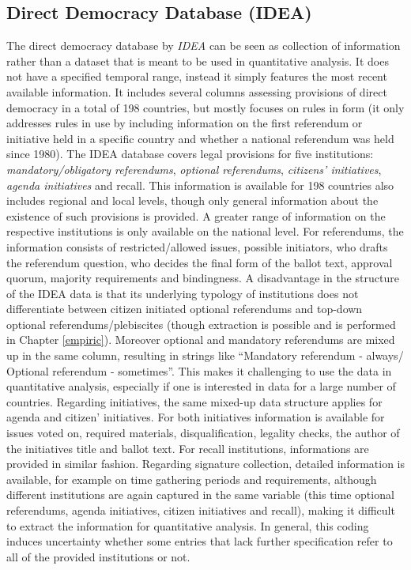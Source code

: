 \documentclass[]{article}
\begin{document}
\subsection{Direct Democracy Database
(IDEA)}\label{direct-democracy-database-idea}

The direct democracy database by \emph{IDEA} can be seen as collection
of information rather than a dataset that is meant to be used in
quantitative analysis. It does not have a specified temporal range,
instead it simply features the most recent available information. It
includes several columns assessing provisions of direct democracy in a
total of 198 countries, but mostly focuses on rules in form (it only
addresses rules in use by including information on the first referendum
or initiative held in a specific country and whether a national
referendum was held since 1980). The IDEA database covers legal
provisions for five institutions: \emph{mandatory/obligatory
referendums}, \emph{optional referendums}, \emph{citizens' initiatives},
\emph{agenda initiatives} and recall. This information is available for
198 countries also includes regional and local levels, though only
general information about the existence of such provisions is provided.
A greater range of information on the respective institutions is only
available on the national level. For referendums, the information
consists of restricted/allowed issues, possible initiators, who drafts
the referendum question, who decides the final form of the ballot text,
approval quorum, majority requirements and bindingness. A disadvantage
in the structure of the IDEA data is that its underlying typology of
institutions does not differentiate between citizen initiated optional
referendums and top-down optional referendums/plebiscites (though
extraction is possible and is performed in Chapter \ref{empiric}).
Moreover optional and mandatory referendums are mixed up in the same
column, resulting in strings like ``Mandatory referendum - always/
Optional referendum - sometimes''. This makes it challenging to use the
data in quantitative analysis, especially if one is interested in data
for a large number of countries. Regarding initiatives, the same
mixed-up data structure applies for agenda and citizen' initiatives. For
both initiatives information is available for issues voted on, required
materials, disqualification, legality checks, the author of the
initiatives title and ballot text. For recall institutions, informations
are provided in similar fashion. Regarding signature collection,
detailed information is available, for example on time gathering periods
and requirements, although different institutions are again captured in
the same variable (this time optional referendums, agenda initiatives,
citizen initiatives and recall), making it difficult to extract the
information for quantitative analysis. In general, this coding induces
uncertainty whether some entries that lack further specification refer
to all of the provided institutions or not.
\end{document}
